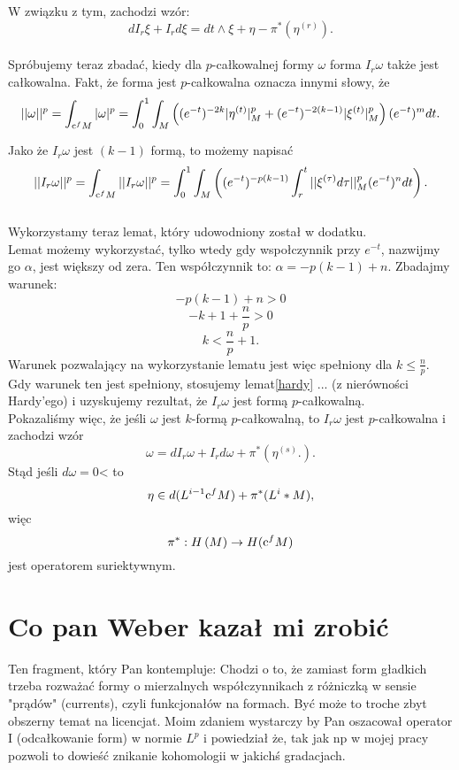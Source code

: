 \documentclass[licencjacka]{pracamgr}
\theoremstyle{definition}
\theoremstyle{definition}
\theoremstyle{plain}
\theoremstyle{plain}
\def\cfm{\ensuremath\mathrm{c}^fM}
\def\M{\ensuremath M}
\begin{document}
W związku z tym, zachodzi wzór:
\[
    d I_r \xi + I_r d \xi = dt \wedge \xi + \eta - \pi^\ast \left( \eta^{(r)} \right).
\] \\

Spróbujemy teraz zbadać, kiedy dla $p$-całkowalnej formy $\omega$ forma $I_r \omega$
także jest całkowalna. Fakt, że forma jest  $p$-całkowalna oznacza innymi słowy, że
\[
    || \omega ||^p = \int_{\cfm} |\omega|^p =
    \int_0^1 \int_{\M} \left(
        (e^{-t})^{-2k} | \eta^{(t)}|^p_{\M} + 
        (e^{-t})^{-2(k-1)} | \xi^{(t)}|^p_{\M} 
    \right)
    (e^{-t})^{m} dt.
\]

Jako że $I_r \omega$ jest $(k-1)$ formą, to możemy napisać
\[
    ||I_r \omega ||^p = 
    \int_{\cfm} ||I_r \omega||^p = 
    \int_0^1 \int_{\M} \left(
        (e^{-t})^{-p(k-1)}
        \int_r^t ||\xi^{(\tau)} d\tau||^p_{\M} (e^{-t})^n dt
    \right).
\] \\

Wykorzystamy teraz lemat, który udowodniony został w dodatku. \\

Lemat możemy wykorzystać, tylko wtedy gdy 
wspołczynnik przy $e^{-t}$, nazwijmy go $\alpha$, jest większy od zera. Ten współczynnik to:
$\alpha = -p(k-1) + n$. Zbadajmy warunek:
\[
    -p(k-1) + n > 0
\]
\[
    -k + 1 + \frac{n}{p} > 0
\]
\[
    k < \frac{n}{p} + 1.
\]
Warunek pozwalający na wykorzystanie lematu jest więc spełniony dla $k \leq \frac{n}{p}$. \\

Gdy warunek ten jest spełniony, stosujemy lemat\ref{hardy} ... (z nierówności Hardy'ego) i uzyskujemy rezultat, że $I_r \omega$
jest formą $p$-całkowalną. \\

Pokazaliśmy więc, że jeśli $\omega$ jest $k$-formą $p$-całkowalną, to  $I_r \omega$ jest
$p$-całkowalna i zachodzi wzór
\[
    \omega = dI_r \omega + I_r d \omega + \pi^\ast 
    \left(
        \eta^{(s)}.
    \right).
\]
Stąd jeśli $d \omega = 0$< to 
\[
    \eta \in d(L^{i-1} \cfm) + \pi^\ast (L^i*\M),
\]
więc 
\[
    \pi^\ast: H \left( \M \right) \rightarrow H ( \cfm )
\]
jest operatorem suriektywnym. \\


\section{Co pan Weber kazał mi zrobić}
Ten fragment, który Pan kontempluje: Chodzi o to, że zamiast form gładkich
trzeba rozważać formy o mierzalnych współczynnikach z różniczką w sensie
"prądów" (currents), czyli funkcjonałów na formach. Być może to troche zbyt
obszerny temat na licencjat. Moim zdaniem wystarczy by Pan oszacował operator I
(odcałkowanie form) w normie $L^p$ i powiedział że, tak jak np w mojej pracy
pozwoli to dowieść znikanie kohomologii w jakichś gradacjach.
\end{document}
